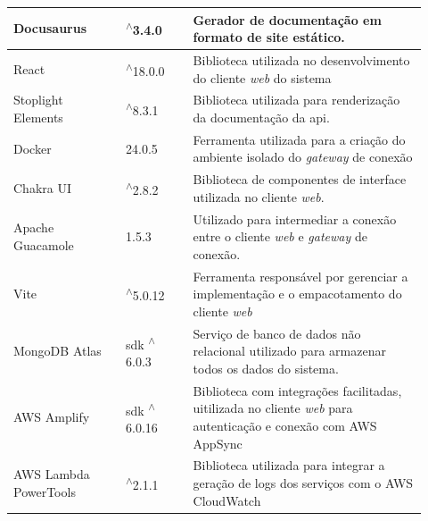 \begin{longtable}{p{0.25\linewidth} p{0.15\linewidth} p{0.525\linewidth}}
Docusaurus \citep{docusaurusdocs} & \textsuperscript{$\wedge$}3.4.0 & Gerador de documentação em formato de site estático. \\

\hline

React \citep{reactdocs} & \textsuperscript{$\wedge$}18.0.0 & Biblioteca utilizada no desenvolvimento do cliente \textit{web} do sistema \\

\hline

Stoplight Elements \citep{stoplightdocs} & \textsuperscript{$\wedge$}8.3.1 & Biblioteca utilizada para renderização da documentação da \gls{api}. \\

\hline

Docker \citep{dockerdocs} & 24.0.5 & Ferramenta utilizada para a criação do ambiente isolado do \textit{gateway} de conexão \\

\hline

Chakra UI \citep{chakrauidocs} & \textsuperscript{$\wedge$}2.8.2 & Biblioteca de componentes de interface utilizada no cliente \textit{web}. \\

\hline

Apache Guacamole \citep{apacheguacamoledocs} & 1.5.3 & Utilizado para intermediar a conexão entre o cliente \textit{web} e \textit{gateway} de conexão. \\

\hline

Vite \citep{vitedocs} & \textsuperscript{$\wedge$}5.0.12 & Ferramenta responsável por gerenciar a implementação e o empacotamento do cliente \textit{web} \\

\hline

MongoDB Atlas \citep{mongodbatlasdocs} & \gls{sdk} \textsuperscript{$\wedge$}6.0.3 & Serviço de banco de dados não relacional utilizado para armazenar todos os dados do sistema. \\

\hline

AWS Amplify \citep{awsamplifydocs} & \gls{sdk} \textsuperscript{$\wedge$}6.0.16 & Biblioteca com integrações facilitadas, uitilizada no cliente \textit{web} para autenticação e conexão com AWS AppSync \\

\hline

AWS Lambda PowerTools \citep{awslambdapowertools} & \textsuperscript{$\wedge$}2.1.1 & Biblioteca utilizada para integrar a geração de logs dos serviços com o AWS CloudWatch \\


\end{longtable}
